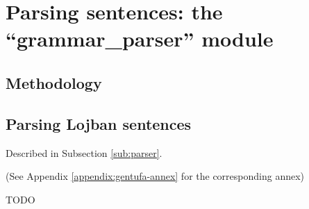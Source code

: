 \chapter{Parsing sentences: the ``grammar\_parser'' module}

\section{Methodology}

\section{Parsing Lojban sentences}
\label{sec:parsing_lojban_sentences}

Described in Subsection \ref{sub:parser}.

(See Appendix \ref{appendix:gentufa-annex} for the corresponding annex)

TODO

